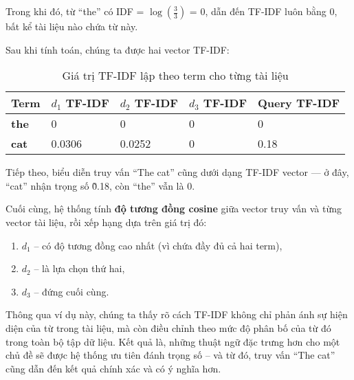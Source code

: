 Trong khi đó, từ ``the'' có IDF = \(\log(\frac{3}{3})\) = 0, dẫn đến TF-IDF luôn bằng 0, bất kể tài liệu nào chứa từ này.

Sau khi tính toán, chúng ta được hai vector TF-IDF:

\begin{table}[H]
    \caption{Giá trị TF-IDF lập theo term cho từng tài liệu}
    \begin{center}
        \begin{tabularx}{\linewidth}{l || X X X l}
            \toprule
            \textbf{Term} & \textbf{\(d_1\) TF-IDF} & \textbf{\(d_2\) TF-IDF} & \textbf{\(d_3\) TF-IDF} & \textbf{Query TF-IDF} \\
            \midrule\midrule
            \textbf{the}  & 0                       & 0                       & 0                       & 0                     \\
            \textbf{cat}  & 0.0306                  & 0.0252                  & 0                       & 0.18                  \\
            \bottomrule
        \end{tabularx}
    \end{center}
\end{table}

Tiếp theo, biểu diễn truy vấn ``The cat'' cũng dưới dạng TF-IDF vector — ở đây, ``cat'' nhận trọng số \~0.18, còn ``the'' vẫn là 0.

Cuối cùng, hệ thống tính \textbf{độ tương đồng cosine} giữa vector truy vấn và từng vector tài liệu, rồi xếp hạng dựa trên giá trị đó:

\begin{enumerate}
    \item \(d_{1}\) -- có độ tương đồng cao nhất (vì chứa đầy đủ cả hai term),
    \item \(d_{2}\) -- là lựa chọn thứ hai,
    \item \(d_{3}\) -- đứng cuối cùng.
\end{enumerate}

Thông qua ví dụ này, chúng ta thấy rõ cách TF-IDF không chỉ phản ánh sự hiện diện của từ trong tài liệu, mà còn điều chỉnh theo mức độ phân bố của từ đó trong toàn bộ tập dữ liệu. Kết quả là, những thuật ngữ đặc trưng hơn cho một chủ đề sẽ được hệ thống ưu tiên đánh trọng số -- và từ đó, truy vấn ``The cat'' cũng dẫn đến kết quả chính xác và có ý nghĩa hơn.

